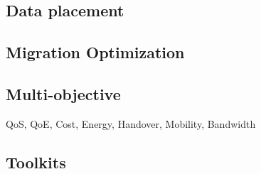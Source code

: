 


\subsection{Data placement}
\label{sec:Dataplacement}



\subsection{Migration Optimization}
\label{sec:Migration}

\subsection{Multi-objective}
\label{sec:Multiobjective}
QoS, QoE, Cost, Energy, Handover, Mobility, Bandwidth
\subsection{Toolkits}
\label{sec:Toolkits}

\vfill\pagebreak
